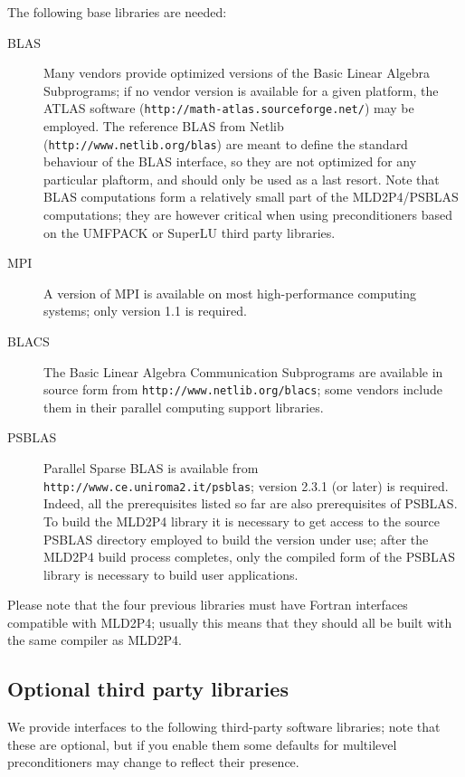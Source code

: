 The following base libraries are needed: 
\begin{description}
\item[BLAS] \cite{blas3,blas2,blas1} Many vendors provide optimized versions
  of the Basic Linear Algebra Subprograms; if no vendor version is
  available for a given platform, the ATLAS software
  (\verb!http://math-atlas.sourceforge.net/!)
  may be employed.  The reference BLAS from Netlib
  (\verb|http://www.netlib.org/blas|) are meant to define the standard
  behaviour of the BLAS interface, so they are not optimized for any
  particular plaftorm, and should only be used as a last
  resort. Note that BLAS computations form a relatively small part of
  the MLD2P4/PSBLAS computations; they are however critical when using
  preconditioners based on the UMFPACK or SuperLU third party
  libraries.  
\item[MPI] \cite{MPI2,MPI1} A version of MPI is available on most
  high-performance computing systems; only version 1.1 is required.
\item[BLACS] \cite{BLACS} The Basic Linear Algebra Communication Subprograms
  are available in source form from \verb|http://www.netlib.org/blacs|;
  some vendors  include them in their parallel computing
  support libraries.
 \item[PSBLAS] \cite{PSBLASGUIDE,psblas_00} Parallel Sparse BLAS is
  available from \\ \verb|http://www.ce.uniroma2.it/psblas|; version 2.3.1
  (or later) is required. Indeed, all the prerequisites
  listed so far are also prerequisites of PSBLAS.
  To build the MLD2P4 library it is necessary to get access to
  the source PSBLAS directory employed to build the version under use; after
  the MLD2P4 build process completes, only the compiled form of the
  PSBLAS library is necessary to build user applications.
\end{description}

Please note that the four previous libraries must have Fortran
interfaces compatible with MLD2P4;
usually this means that they should all be built with the same
compiler as MLD2P4.

\subsection{Optional third party libraries}

We provide interfaces to the following third-party software libraries;
note that these are optional, but if you enable them some defaults
for multilevel preconditioners may change to reflect their presence. 

